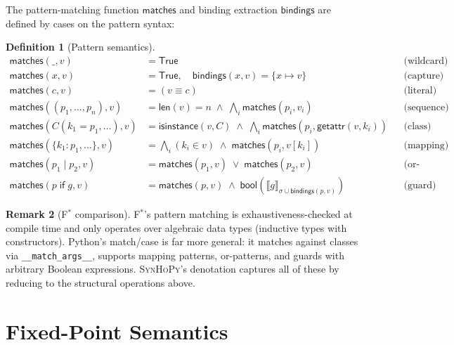 \documentclass[11pt,a4paper]{report}
\theoremstyle{definition}
\newtheorem{definition}{Definition}[chapter]
\newtheorem{remark}[definition]{Remark}
\theoremstyle{plain}
\newcommand{\den}[1]{\llbracket #1 \rrbracket}
\newcommand{\fstar}{F$^{*}$}
\newcommand{\synhopy}{\textsc{SynHoPy}}
\begin{document}
The pattern-matching function $\mathsf{matches}$ and binding extraction
$\mathsf{bindings}$ are defined by cases on the pattern syntax:

\begin{definition}[Pattern semantics]
\label{def:pattern-sem}
\begin{align}
  \mathsf{matches}(\_, v) &= \mathsf{True}
    && \text{(wildcard)} \\
  \mathsf{matches}(x, v) &= \mathsf{True}, \quad \mathsf{bindings}(x, v) = \{x \mapsto v\}
    && \text{(capture)} \\
  \mathsf{matches}(c, v) &= (v \equiv c)
    && \text{(literal)} \\
  \mathsf{matches}((p_1, \ldots, p_n), v)
    &= \mathsf{len}(v) = n \;\wedge\; \bigwedge_{i} \mathsf{matches}(p_i, v_i)
    && \text{(sequence)} \\
  \mathsf{matches}(C(k_1\!=p_1, \ldots), v)
    &= \mathsf{isinstance}(v, C) \;\wedge\; \bigwedge_{i} \mathsf{matches}(p_i, \mathsf{getattr}(v, k_i))
    && \text{(class)} \\
  \mathsf{matches}(\{k_1\!: p_1, \ldots\}, v)
    &= \bigwedge_{i} (k_i \in v) \;\wedge\; \mathsf{matches}(p_i, v[k_i])
    && \text{(mapping)} \\
  \mathsf{matches}(p_1 \mid p_2, v)
    &= \mathsf{matches}(p_1, v) \;\vee\; \mathsf{matches}(p_2, v)
    && \text{(or-pattern)} \\
  \mathsf{matches}(p\;\mathsf{if}\;g, v)
    &= \mathsf{matches}(p, v) \;\wedge\; \mathsf{bool}(\den{g}_{\sigma \cup \mathsf{bindings}(p,v)})
    && \text{(guard)}
\end{align}
\end{definition}

\begin{remark}[\fstar{} comparison]
\fstar{}'s pattern matching is exhaustiveness-checked at compile time and
only operates over algebraic data types (inductive types with constructors).
Python's match/case is far more general: it matches against classes via
\lstinline[style=python]{__match_args__}, supports mapping patterns, or-patterns,
and guards with arbitrary Boolean expressions.  \synhopy{}'s denotation captures
all of these by reducing to the structural operations above.
\end{remark}


\section{Fixed-Point Semantics}
\end{document}
